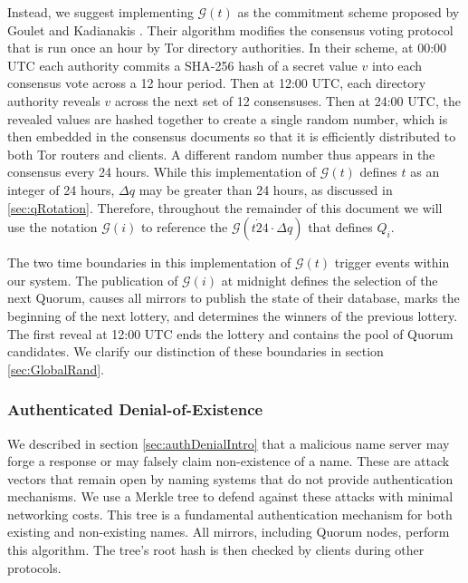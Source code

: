 \documentclass[USenglish,oneside,twocolumn]{article}
\begin{document}
Instead, we suggest implementing $ \mathcal{G}(t) $ as the commitment scheme proposed by Goulet and Kadianakis \cite{GouletCommitReveal}. Their algorithm modifies the consensus voting protocol that is run once an hour by Tor directory authorities. In their scheme, at 00:00 UTC each authority commits a SHA-256 hash of a secret value $ v $ into each consensus vote across a 12 hour period. Then at 12:00 UTC, each directory authority reveals $ v $ across the next set of 12 consensuses. Then at 24:00 UTC, the revealed values are hashed together to create a single random number, which is then embedded in the consensus documents so that it is efficiently distributed to both Tor routers and clients. A different random number thus appears in the consensus every 24 hours. While this implementation of $ \mathcal{G}(t) $ defines $ t $ as an integer of 24 hours, $ \Delta q $ may be greater than 24 hours, as discussed in \ref{sec:qRotation}. Therefore, throughout the remainder of this document we will use the notation $ \mathcal{G}(i) $ to reference the $ \mathcal{G}(t \dot 24 \cdot \Delta q) $ that defines $ Q_{i} $.


The two time boundaries in this implementation of $ \mathcal{G}(t) $ trigger events within our system. The publication of $ \mathcal{G}(i) $ at midnight defines the selection of the next Quorum, causes all mirrors to publish the state of their database, marks the beginning of the next lottery, and determines the winners of the previous lottery. The first reveal at 12:00 UTC ends the lottery and contains the pool of Quorum candidates. We clarify our distinction of these boundaries in section \ref{sec:GlobalRand}. 


\subsubsection{Authenticated Denial-of-Existence}
\label{sec:authDenial}

We described in section \ref{sec:authDenialIntro} that a malicious name server may forge a response or may falsely claim non-existence of a name. These are attack vectors that remain open by naming systems that do not provide authentication mechanisms. We use a Merkle tree \cite{merkle1988digital} to defend against these attacks with minimal networking costs. This tree is a fundamental authentication mechanism for both existing and non-existing names. All mirrors, including Quorum nodes, perform this algorithm. The tree's root hash is then checked by clients during other protocols.
\end{document}
